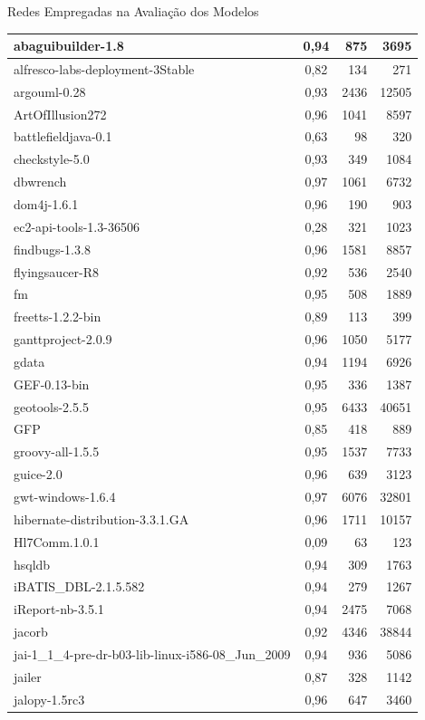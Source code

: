 \begin{chapter}{Redes Empregadas na Avaliação dos Modelos}
\begin{center}
\begin{longtable}{| p{10cm} | c | r | r |}
	abaguibuilder-1.8 & 0,94 & 875 & 3695 \\ \hline
	alfresco-labs-deployment-3Stable & 0,82 & 134 & 271 \\ \hline
	argouml-0.28 & 0,93 & 2436 & 12505 \\ \hline
	ArtOfIllusion272 & 0,96 & 1041 & 8597 \\ \hline
	battlefieldjava-0.1 & 0,63 & 98 & 320 \\ \hline
	checkstyle-5.0 & 0,93 & 349 & 1084 \\ \hline
	dbwrench & 0,97 & 1061 & 6732 \\ \hline
	dom4j-1.6.1 & 0,96 & 190 & 903 \\ \hline
	ec2-api-tools-1.3-36506 & 0,28 & 321 & 1023 \\ \hline
	findbugs-1.3.8 & 0,96 & 1581 & 8857 \\ \hline
	flyingsaucer-R8 & 0,92 & 536 & 2540 \\ \hline
	fm & 0,95 & 508 & 1889 \\ \hline
	freetts-1.2.2-bin & 0,89 & 113 & 399 \\ \hline
	ganttproject-2.0.9 & 0,96 & 1050 & 5177 \\ \hline
	gdata & 0,94 & 1194 & 6926 \\ \hline
	GEF-0.13-bin & 0,95 & 336 & 1387 \\ \hline
	geotools-2.5.5 & 0,95 & 6433 & 40651 \\ \hline
	GFP & 0,85 & 418 & 889 \\ \hline
	groovy-all-1.5.5 & 0,95 & 1537 & 7733 \\ \hline
	guice-2.0 & 0,96 & 639 & 3123 \\ \hline
	gwt-windows-1.6.4 & 0,97 & 6076 & 32801 \\ \hline
	hibernate-distribution-3.3.1.GA & 0,96 & 1711 & 10157 \\ \hline
	Hl7Comm.1.0.1 & 0,09 & 63 & 123 \\ \hline
	hsqldb & 0,94 & 309 & 1763 \\ \hline
	iBATIS\_DBL-2.1.5.582 & 0,94 & 279 & 1267 \\ \hline
	iReport-nb-3.5.1 & 0,94 & 2475 & 7068 \\ \hline
	jacorb & 0,92 & 4346 & 38844 \\ \hline
	jai-1\_1\_4-pre-dr-b03-lib-linux-i586-08\_Jun\_2009 & 0,94 & 936 & 5086 \\ \hline
	jailer & 0,87 & 328 & 1142 \\ \hline
	jalopy-1.5rc3 & 0,96 & 647 & 3460 \\ \hline

\end{longtable}
\end{center}
\end{chapter}
